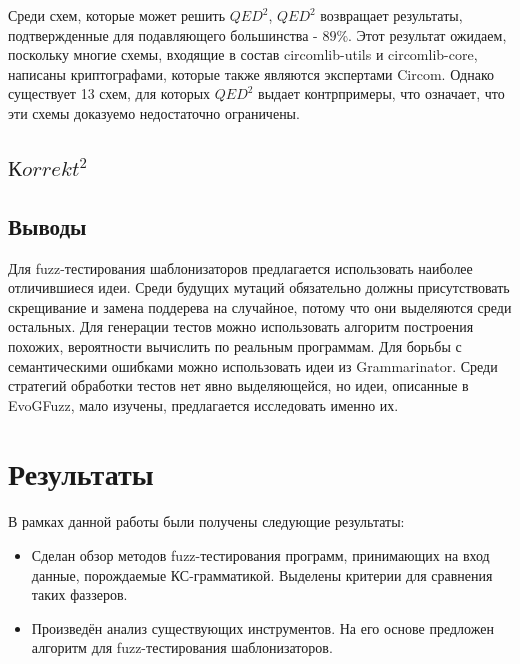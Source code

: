 \documentclass[a4paper]{article}
\begin{document}
Среди схем, которые может решить $QED^2$, $QED^2$ возвращает результаты, подтвержденные для подавляющего большинства - $89\%$.
Этот результат ожидаем, поскольку многие схемы, входящие в состав circomlib-utils и circomlib-core, написаны криптографами, которые также являются экспертами Circom. Однако существует 13 схем, для
которых $QED^2$ выдает контрпримеры, что означает, что эти схемы доказуемо недостаточно ограничены.

\subsection{$Кorrekt^2$}

\subsection{Выводы}
\indent

Для fuzz-тестирования шаблонизаторов предлагается использовать наиболее отличившиеся идеи. Среди будущих мутаций обязательно должны присутствовать скрещивание и замена поддерева на случайное, потому что они выделяются среди остальных. Для генерации тестов можно использовать алгоритм построения похожих, вероятности вычислить по реальным программам. Для борьбы с семантическими ошибками можно использовать идеи из Grammarinator. Среди стратегий обработки тестов нет явно выделяющейся, но идеи, описанные в EvoGFuzz, мало изучены, предлагается исследовать именно их.

\newpage
\section{Результаты}
\indent

В рамках данной работы были получены следующие результаты:
\begin{itemize}
    \item Сделан обзор методов fuzz-тестирования программ, принимающих на вход данные, порождаемые КС-грамматикой. Выделены критерии для сравнения таких фаззеров.
    \item Произведён анализ существующих инструментов. На его основе предложен алгоритм для fuzz-тестирования шаблонизаторов.
\end{itemize}

\newpage
\end{document}
